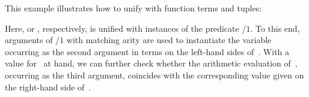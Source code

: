 \begin{example}\label{ex:unify}
This example illustrates how to unify with function terms and tuples:
%

%
Here,  or
, respectively,
is unified with instances of the predicate /$1$.
To this end,
arguments of /$1$ with matching arity
are used to instantiate the variable~ occurring
as the second argument in terms on the left-hand sides of~\code{=}.
With a value for~ at hand,
we can further check whether the arithmetic evaluation of~,
occurring as the third argument, coincides with the
corresponding value given on the right-hand side of~\code{=}.
%
\eexample
\end{example}

